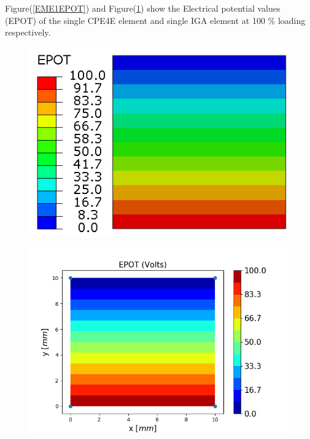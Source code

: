 \documentclass[11pt]{article}
\begin{document}
Figure(\ref{EME1EPOT}) and Figure(\ref{EME1EPOT_IGA}) show the Electrical potential values (EPOT) of the single CPE4E element and single IGA element at 100 \% loading respectively. \\
\begin{figure}[H]
	\centering
	\begin{minipage}{.5\textwidth}
		\centering
		\includegraphics[width=1\linewidth]{EME1EPOT.png}
		\label{EME1EPOT}
	\end{minipage}%
	\begin{minipage}{.6\textwidth}
		\centering
		\includegraphics[width=1\linewidth]{EME1EPOT_IGA.png}
		\label{EME1EPOT_IGA}
	\end{minipage}
\end{figure}
\end{document}
